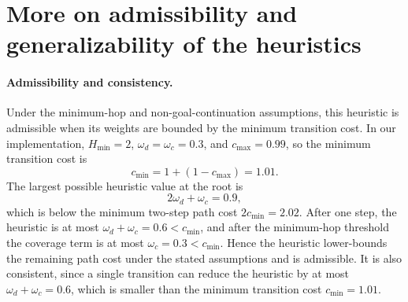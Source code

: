 \documentclass[11pt]{article}
\begin{document}




\section{More on admissibility and generalizability of the heuristics}\label{more-on}

\paragraph{Admissibility and consistency.}
Under the minimum-hop and non-goal-continuation assumptions, this
heuristic is admissible when its weights are bounded by the minimum
transition cost. In our implementation, \(H_{\min}=2\),
\(\omega_d=\omega_c=0.3\), and \(c_{\max}=0.99\), so the minimum
transition cost is
\[
c_{\min}=1+(1-c_{\max})=1.01.
\]
The largest possible heuristic value at the root is
\[
2\omega_d+\omega_c=0.9,
\]
which is below the minimum two-step path cost \(2c_{\min}=2.02\). After
one step, the heuristic is at most \(\omega_d+\omega_c=0.6<c_{\min}\),
and after the minimum-hop threshold the coverage term is at most
\(\omega_c=0.3<c_{\min}\). Hence the heuristic lower-bounds the remaining
path cost under the stated assumptions and is admissible. It is also
consistent, since a single transition can reduce the heuristic by at most
\(\omega_d+\omega_c=0.6\), which is smaller than the minimum transition
cost \(c_{\min}=1.01\).
\end{document}
